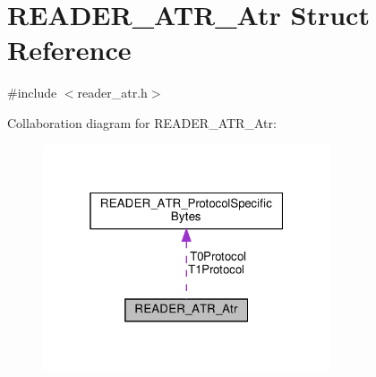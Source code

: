 \hypertarget{struct_r_e_a_d_e_r___a_t_r___atr}{}\section{R\+E\+A\+D\+E\+R\+\_\+\+A\+T\+R\+\_\+\+Atr Struct Reference}
\label{struct_r_e_a_d_e_r___a_t_r___atr}


{\ttfamily \#include $<$reader\+\_\+atr.\+h$>$}



Collaboration diagram for R\+E\+A\+D\+E\+R\+\_\+\+A\+T\+R\+\_\+\+Atr\+:
\nopagebreak
\begin{figure}[H]
\begin{center}
\leavevmode
\includegraphics[width=241pt]{struct_r_e_a_d_e_r___a_t_r___atr__coll__graph}
\end{center}
\end{figure}

